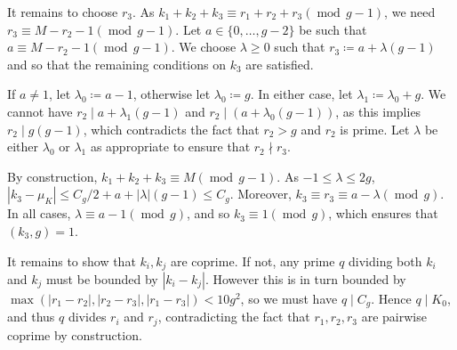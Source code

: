 \documentclass[hidelinks,11pt,reqno]{amsart}
\renewcommand{\leq}{\leqslant}
\renewcommand{\geq}{\geqslant}
\theoremstyle{remark}
\newcommand{\md}[1]{\ensuremath{(\operatorname{mod}\, #1)}}
\begin{document}
It remains to choose $r_{3}$. As $k_{1}+k_{2}+k_{3}\equiv r_{1}+r_{2}+r_{3}\md{g-1}$, we need $r_{3}\equiv M-r_{2}-1\md{g-1}$. Let $a\in\{0,\ldots, g-2\}$ be such that $a\equiv M-r_{2}-1\md{g-1}$. We choose $\lambda\geq 0$ such that $r_{3}\coloneq a+\lambda(g-1)$ and so that the remaining conditions on $k_{3}$ are satisfied. 

If $a\neq 1$, let $\lambda_{0}\coloneq a-1$, otherwise let  $\lambda_{0}\coloneq g$. In either case, let $\lambda_{1}\coloneq \lambda_{0}+g$. We cannot have $r_{2}\mid a+\lambda_{1}(g-1)$ and $r_{2}\mid (a+\lambda_{0}(g-1))$, as this implies $r_{2}\mid g(g-1)$, which contradicts the fact that $r_{2}>g$ and $r_{2}$ is prime. Let $\lambda$ be either $\lambda_{0}$ or $\lambda_{1}$ as appropriate to ensure that $r_{2}\nmid r_{3}$.

By construction, $k_{1}+k_{2}+k_{3}\equiv M \md{g-1}$. As $-1\leq \lambda\leq 2g$, $|k_{3}-\mu_{K}|\leq C_{g}/2+a+|\lambda|(g-1)\leq C_{g}$. Moreover, $k_{3}\equiv r_{3}\equiv a-\lambda \md{g}$. In all cases, $\lambda\equiv a-1\md{g}$, and so $k_{3}\equiv 1\md{g}$, which ensures that $(k_{3},g)=1$. 

It remains to show that $k_{i},k_{j}$ are coprime. If not, any prime $q$ dividing both $k_{i}$ and $k_{j}$ must be bounded by $|k_{i}-k_{j}|$. However this is in turn bounded by $\max (|r_{1}-r_{2}|,|r_{2}-r_{3}|,|r_{1}-r_{3}|)<10g^{2}$, so we must have $q\mid C_{g}$. Hence $q\mid K_{0}$, and thus $q$ divides $r_{i}$ and $r_{j}$, contradicting the fact that $r_{1},r_{2},r_{3}$ are pairwise coprime by construction. 

\appendix
\end{document}

